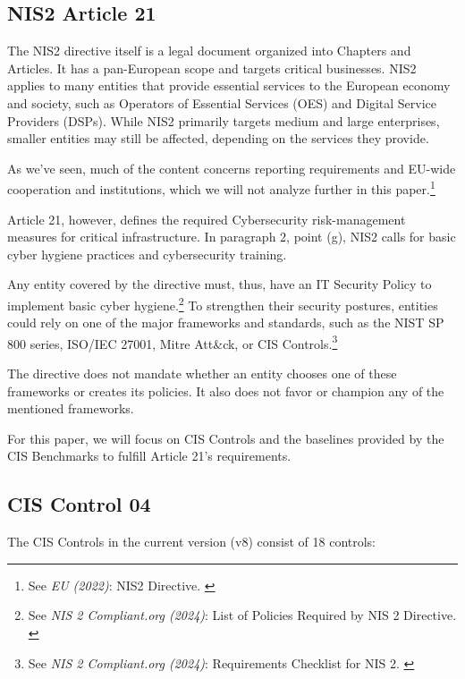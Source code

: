 \pagebreak

\subsection{NIS2 Article 21}

The NIS2 directive itself is a legal document organized into Chapters and Articles. It has a pan-European scope and targets critical businesses. NIS2 applies to many entities that provide essential services to the European economy and society, such as Operators of Essential Services (OES) and Digital Service Providers (DSPs). While NIS2 primarily targets medium and large enterprises, smaller entities may still be affected, depending on the services they provide.

As we've seen, much of the content concerns reporting requirements and EU-wide cooperation and institutions, which we will not analyze further in this paper.\footnote{See \textit{EU (2022)}: NIS2 Directive. \cite{nis2}}

Article 21, however, defines the required Cybersecurity risk-management measures for critical infrastructure. In paragraph 2, point (g), NIS2 calls for basic cyber hygiene practices and cybersecurity training.

Any entity covered by the directive must, thus, have an IT Security Policy to implement basic cyber hygiene.\footnote{See \textit{NIS 2 Compliant.org (2024)}: List of Policies Required by NIS 2 Directive. \cite{nisPols}} To strengthen their security postures, entities could rely on one of the major frameworks and standards, such as the NIST SP 800 series, ISO/IEC 27001, Mitre Att\&ck, or CIS Controls.\footnote{See \textit{NIS 2 Compliant.org (2024)}: Requirements Checklist for NIS 2. \cite{nisReqs}}

The directive does not mandate whether an entity chooses one of these frameworks or creates its policies. It also does not favor or champion any of the mentioned frameworks.

For this paper, we will focus on CIS Controls and the baselines provided by the CIS Benchmarks to fulfill Article 21's requirements.

\subsection{CIS Control 04}

The CIS Controls in the current version (v8) consist of 18 controls:


